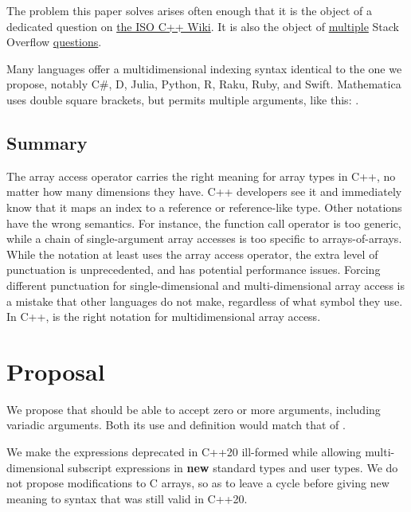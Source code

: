 \documentclass{wg21}
\begin{document}
The problem this paper solves arises often enough that it is the object of a dedicated question on \href{https://isocpp.org/wiki/faq/operator-overloading#matrix-subscript-op}{the ISO C++ Wiki}.  It is also the object of \href{https://stackoverflow.com/questions/7032743/can-cs-operator-take-more-than-one-argument}{multiple} Stack Overflow \href{https://stackoverflow.com/questions/1936399/c-array-operator-with-multiple-arguments/1936410}{questions}.

Many languages offer a multidimensional indexing syntax identical to the one we propose, notably C\#, D, Julia, Python, R, Raku, Ruby, and Swift.  Mathematica uses double square brackets, but permits multiple arguments, like this: .

\subsection{Summary}

The array access operator carries the right meaning for array types in C++, no matter how many dimensions they have.  C++ developers see it and immediately know that it maps an index to a reference or reference-like type.  Other notations have the wrong semantics.  For instance, the function call operator is too generic, while a chain of single-argument array accesses is too specific to arrays-of-arrays.  While the notation  at least uses the array access operator, the extra level of punctuation is unprecedented, and has potential performance issues.  Forcing different punctuation for single-dimensional and multi-dimensional array access is a mistake that other languages do not make, regardless of what symbol they use.  In C++,  is the right notation for multidimensional array access.

\section{Proposal}

We propose that  should be able to accept zero or more arguments, including variadic arguments.
Both its use and definition would match that of .

We make the expressions deprecated in C++20 ill-formed while allowing multi-dimensional subscript expressions in \textbf{new} standard types
and user types. We do not propose modifications to C arrays, so as to leave a cycle before giving new meaning to syntax that was still valid in C++20.
\end{document}
